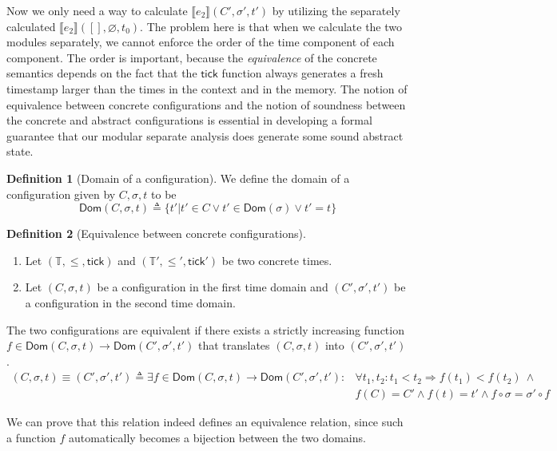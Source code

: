 \documentclass{article}
\theoremstyle{definition}
\newtheorem{definition}{Definition}[section]
\newcommand*{\Time}{\mathbb{T}}
\newcommand*{\sembracket}[1]{\lBrack{#1}\rBrack}
\newcommand*{\tick}{\mathsf{tick}}
\begin{document}
Now we only need a way to calculate $\sembracket{e_{2}}(C',\sigma',t')$ by utilizing the separately calculated $\sembracket{e_{2}}([],\varnothing,t_{0})$.
The problem here is that when we calculate the two modules separately, we cannot enforce the order of the time component of each component.
The order is important, because the \emph{equivalence} of the concrete semantics depends on the fact that the $\tick$ function always generates a fresh timestamp larger than the times in the context and in the memory.
The notion of equivalence between concrete configurations and the notion of soundness between the concrete and abstract configurations is essential in developing a formal guarantee that our modular separate analysis does generate some sound abstract state.

\begin{definition}[Domain of a configuration]
  We define the domain of a configuration given by $C, \sigma, t$ to be
  \[
    \mathsf{Dom}(C,\sigma,t)\triangleq\{t'|t'\in C\lor t'\in\mathsf{Dom}(\sigma)\lor t' = t\}
  \]
\end{definition}

\begin{definition}[Equivalence between concrete configurations]
  $\:$

  \begin{enumerate}
    \item Let $(\Time,\le,\tick)$ and $(\Time',\le',\tick')$ be two concrete times.
    \item Let $(C,\sigma,t)$ be a configuration in the first time domain and $(C',\sigma',t')$ be a configuration in the second time domain.
  \end{enumerate}
  The two configurations are equivalent if there exists a strictly increasing function $f\in\mathsf{Dom}(C,\sigma,t)\rightarrow\mathsf{Dom}(C',\sigma',t')$ that translates $(C,\sigma,t)$ into $(C',\sigma',t')$.
  \begin{align*}
    (C,\sigma,t)\equiv(C',\sigma',t')\triangleq\exists f\in\mathsf{Dom}(C,\sigma,t)\rightarrow\mathsf{Dom}(C',\sigma',t'): & \forall t_{1},t_{2}: t_{1} < t_{2} \Rightarrow f(t_{1}) < f(t_{2})\:\wedge \\
                                                                                                                           & f(C)= C' \wedge f(t) = t' \wedge f\circ\sigma = \sigma'\circ f
  \end{align*}
\end{definition}

We can prove that this relation indeed defines an equivalence relation, since such a function $f$ automatically becomes a bijection between the two domains.
\end{document}
